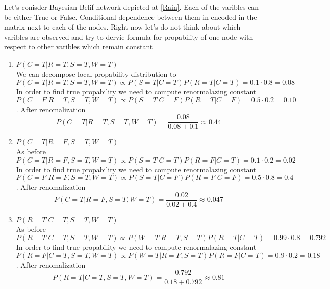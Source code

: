 \documentclass[12pt,a4paper]{article}
\begin{document}
\hspace{1cm}\par Let's conisder Bayesian Belif network depicted at \ref{Rain}. Each of the varibles can be either True or False. Conditional dependence between them in encoded in the matrix next 
to each of the nodes. Right now let's do not think about which varibles are observed and try to dervie formula for propability of one node with respect to other varibles which remain constant
\begin{enumerate}
    \item {\Large \textbf{$P(C=T|R=T,S=T,W=T)$}}\\
    We can decompose local propability distribution to 
    \begin{equation*}
        P(C=T|R=T,S=T,W=T)\propto P(S=T|C=T)P(R=T|C=T)=0.1\cdot0.8=0.08
    \end{equation*}
    In order to find true propability we need to compute renormalazing constant
    \begin{equation*}
        P(C=F|R=T,S=T,W=T)\propto P(S=T|C=F)P(R=T|C=F)=0.5\cdot0.2=0.10
    \end{equation*}.
    After renomalization
    \begin{equation*}
        P(C=T|R=T,S=T,W=T)=\frac{0.08}{0.08+0.1}\approx0.44
    \end{equation*}

    \item{\Large \textbf{$P(C=T|R=F,S=T,W=T)$}}\\
    As before
    \begin{equation*}
        P(C=T|R=F,S=T,W=T)\propto P(S=T|C=T)P(R=F|C=T)=0.1\cdot0.2=0.02
    \end{equation*}
    In order to find true propability we need to compute renormalazing constant
    \begin{equation*}
        P(C=F|R=F,S=T,W=T)\propto P(S=T|C=F)P(R=F|C=F)=0.5\cdot0.8=0.4
    \end{equation*}.
    After renomalization
    \begin{equation*}
        P(C=T|R=F,S=T,W=T)=\frac{0.02}{0.02+0.4}\approx0.047
    \end{equation*}

    \item {\Large \textbf{$P(R=T|C=T,S=T,W=T)$}} \\
    As before
    \begin{equation*}
        P(R=T|C=T,S=T,W=T)\propto P(W=T|R=T,S=T)P(R=T|C=T)=0.99\cdot0.8=0.792
    \end{equation*}
    In order to find true propability we need to compute renormalazing constant
    \begin{equation*}
        P(R=F|C=T,S=T,W=T)\propto P(W=T|R=F,S=T)P(R=F|C=T)=0.9\cdot0.2=0.18
    \end{equation*}.
    After renomalization
    \begin{equation*}
        P(R=T|C=T,S=T,W=T)=\frac{0.792}{0.18+0.792}\approx0.81
    \end{equation*}


\end{enumerate}
\end{document}
